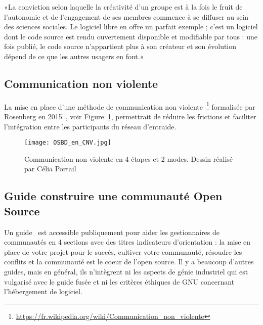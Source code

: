 «La conviction selon laquelle la créativité d’un groupe est à la fois le fruit de l’autonomie et de l’engagement de ses membres commence à se diffuser au sein des sciences sociales. Le logiciel libre en offre un parfait exemple ; c’est un logiciel dont le code source est rendu ouvertement disponible et modifiable par tous : une fois publié, le code source n’appartient plus à son créateur et son évolution dépend de ce que les autres usagers en font.»~\cite{REDP_173_0387}

\subsection{Communication non violente}

La mise en place d’une méthode de communication non violente~\footnote{\url{https://fr.wikipedia.org/wiki/Communication_non_violente}} formalisée par Rosenberg en 2015~\cite{rosenberg2015nonviolent}, voir Figure~\ref{fig:communication_non_violente}, permettrait de réduire les frictions et faciliter l'intégration entre les participants du réseau d’entraide.

\begin{figure}[htb]
\centering
\texttt{[image: OSBD\_en\_CNV.jpg]}
\caption{Communication non violente en 4 étapes et 2 modes. Dessin réalisé par Célia Portail~\cite{wikipedia_image_non_violente}}
\label{fig:communication_non_violente}
\end{figure}

\subsection{Guide construire une communauté Open Source}

Un guide~\cite{url_open_source_guide} est accessible publiquement pour aider les gestionnaires de communautés en 4 sections avec des titres indicateurs d’orientation : la mise en place de votre projet pour le succès, cultiver votre communauté, résoudre les conflits et la communauté est le coeur de l'open source. Il y a beaucoup d'autres guides, mais en général, ils n'intègrent ni les aspects de génie industriel qui est vulgarisé avec le guide fusée et ni les critères éthiques de GNU concernant l’hébergement de logiciel.


